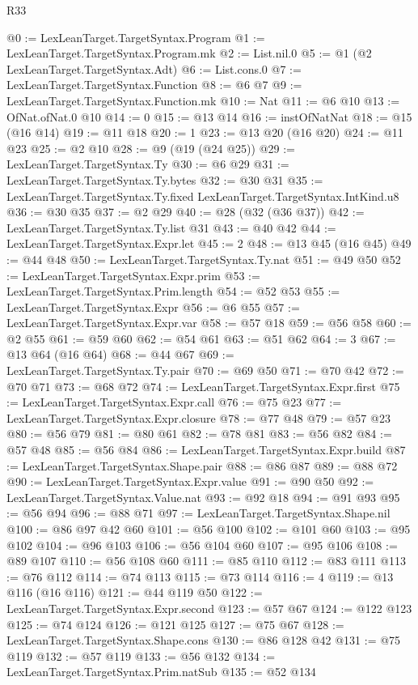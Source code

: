 \begin{lexlean}{R33}
\begin{coremodule}
@0 := LexLeanTarget.TargetSyntax.Program
@1 := LexLeanTarget.TargetSyntax.Program.mk
@2 := List.nil.{0}
@5 := @1 (@2 LexLeanTarget.TargetSyntax.Adt)
@6 := List.cons.{0}
@7 := LexLeanTarget.TargetSyntax.Function
@8 := @6 @7
@9 := LexLeanTarget.TargetSyntax.Function.mk
@10 := Nat
@11 := @6 @10
@13 := OfNat.ofNat.{0} @10
@14 := 0
@15 := @13 @14
@16 := instOfNatNat
@18 := @15 (@16 @14)
@19 := @11 @18
@20 := 1
@23 := @13 @20 (@16 @20)
@24 := @11 @23
@25 := @2 @10
@28 := @9 (@19 (@24 @25))
@29 := LexLeanTarget.TargetSyntax.Ty
@30 := @6 @29
@31 := LexLeanTarget.TargetSyntax.Ty.bytes
@32 := @30 @31
@35 := LexLeanTarget.TargetSyntax.Ty.fixed LexLeanTarget.TargetSyntax.IntKind.u8
@36 := @30 @35
@37 := @2 @29
@40 := @28 (@32 (@36 @37))
@42 := LexLeanTarget.TargetSyntax.Ty.list @31
@43 := @40 @42
@44 := LexLeanTarget.TargetSyntax.Expr.let
@45 := 2
@48 := @13 @45 (@16 @45)
@49 := @44 @48
@50 := LexLeanTarget.TargetSyntax.Ty.nat
@51 := @49 @50
@52 := LexLeanTarget.TargetSyntax.Expr.prim
@53 := LexLeanTarget.TargetSyntax.Prim.length
@54 := @52 @53
@55 := LexLeanTarget.TargetSyntax.Expr
@56 := @6 @55
@57 := LexLeanTarget.TargetSyntax.Expr.var
@58 := @57 @18
@59 := @56 @58
@60 := @2 @55
@61 := @59 @60
@62 := @54 @61
@63 := @51 @62
@64 := 3
@67 := @13 @64 (@16 @64)
@68 := @44 @67
@69 := LexLeanTarget.TargetSyntax.Ty.pair
@70 := @69 @50
@71 := @70 @42
@72 := @70 @71
@73 := @68 @72
@74 := LexLeanTarget.TargetSyntax.Expr.first
@75 := LexLeanTarget.TargetSyntax.Expr.call
@76 := @75 @23
@77 := LexLeanTarget.TargetSyntax.Expr.closure
@78 := @77 @48
@79 := @57 @23
@80 := @56 @79
@81 := @80 @61
@82 := @78 @81
@83 := @56 @82
@84 := @57 @48
@85 := @56 @84
@86 := LexLeanTarget.TargetSyntax.Expr.build
@87 := LexLeanTarget.TargetSyntax.Shape.pair
@88 := @86 @87
@89 := @88 @72
@90 := LexLeanTarget.TargetSyntax.Expr.value
@91 := @90 @50
@92 := LexLeanTarget.TargetSyntax.Value.nat
@93 := @92 @18
@94 := @91 @93
@95 := @56 @94
@96 := @88 @71
@97 := LexLeanTarget.TargetSyntax.Shape.nil
@100 := @86 @97 @42 @60
@101 := @56 @100
@102 := @101 @60
@103 := @95 @102
@104 := @96 @103
@106 := @56 @104 @60
@107 := @95 @106
@108 := @89 @107
@110 := @56 @108 @60
@111 := @85 @110
@112 := @83 @111
@113 := @76 @112
@114 := @74 @113
@115 := @73 @114
@116 := 4
@119 := @13 @116 (@16 @116)
@121 := @44 @119 @50
@122 := LexLeanTarget.TargetSyntax.Expr.second
@123 := @57 @67
@124 := @122 @123
@125 := @74 @124
@126 := @121 @125
@127 := @75 @67
@128 := LexLeanTarget.TargetSyntax.Shape.cons
@130 := @86 @128 @42
@131 := @75 @119
@132 := @57 @119
@133 := @56 @132
@134 := LexLeanTarget.TargetSyntax.Prim.natSub
@135 := @52 @134

\end{coremodule}
\end{lexlean}
